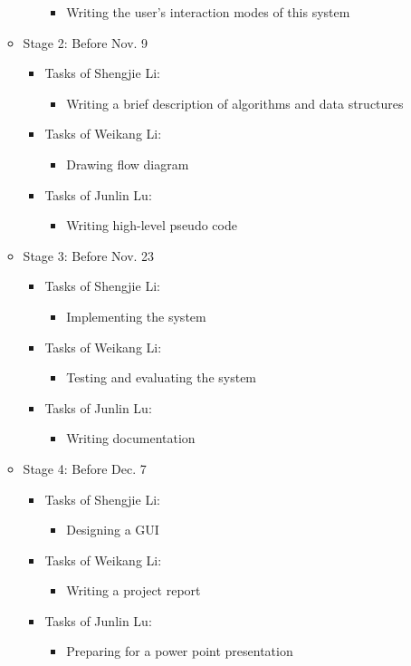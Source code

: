 \begin{itemize}
\begin{itemize}
\begin{itemize}
\begin{itemize}
			\item {Writing the user's interaction modes of this system}
		\end{itemize}
	\end{itemize}
	\item {Stage 2: Before Nov. 9 } 
	\begin{itemize}
		\item {Tasks of Shengjie Li:}
		\begin{itemize}
			\item {Writing a brief description of algorithms and data structures}
		\end{itemize}
		\item {Tasks of Weikang Li:}
		\begin{itemize}
			\item {Drawing flow diagram}
		\end{itemize}
		\item {Tasks of Junlin Lu:}
		\begin{itemize}
			\item {Writing high-level pseudo code}
		\end{itemize}
	\end{itemize}
	\item {Stage 3: Before Nov. 23 } 
	\begin{itemize}
		\item {Tasks of Shengjie Li:}
		\begin{itemize}
			\item {Implementing the system}
		\end{itemize}
		\item {Tasks of Weikang Li:}
		\begin{itemize}
			\item {Testing and evaluating the system}
		\end{itemize}
		\item {Tasks of Junlin Lu:}
		\begin{itemize}
			\item {Writing documentation}
		\end{itemize}
	\end{itemize}
	\item {Stage 4: Before Dec. 7 } 
	\begin{itemize}
		\item {Tasks of Shengjie Li:}
		\begin{itemize}
			\item {Designing a GUI}
		\end{itemize}
		\item {Tasks of Weikang Li:}
		\begin{itemize}
			\item {Writing a project report}
		\end{itemize}
		\item {Tasks of Junlin Lu:}
		\begin{itemize}
			\item {Preparing for a power point presentation}
		\end{itemize}
	\end{itemize}
\end{itemize} 
\end{itemize}

